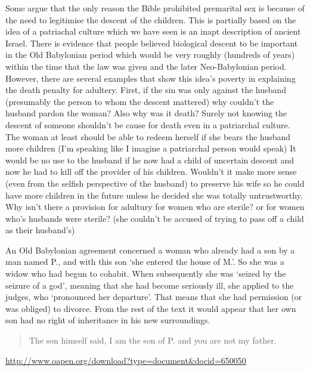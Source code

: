 \documentclass[11pt]{article}
\begin{document}
{Some argue that the only reason the Bible prohibited premarital sex is because of the need to legitimise the descent of the children. This is partially based on the idea of a patriachal culture which we have seen is an inapt description of ancient Israel. There is evidence that people believed biological descent to be important in the Old Babylonian period\cite{son of p} which would be very roughly (hundreds of years) within the time that the law was given and the later Neo-Babylonian period. \cite{exorcist in emar} However, there are several examples that show this idea's poverty in explaining the death penalty for adultery. First, if the sin was only against the husband (presumably the person to whom the descent mattered) why couldn't the husband pardon the woman? Also why was it death? Surely not knowing the descent of someone shouldn't be cause for death even in a patriarchal culture. The woman at least should be able to redeem herself if she bears the husband more children (I'm speaking like I imagine a patriarchal person would speak) It would be no use to the husband if he now had a child of uncertain descent and now he had to kill off the provider of his children. Wouldn't it make more sense (even from the selfish perspective of the husband) to preserve his wife so he could have more children in the future unless he decided she was totally untrustworthy. Why isn't there a provision for adultury for women who are sterile? or for women who's husbands were sterile? (she couldn't be accused of trying to pass off a child as their husband's) 





\medskip
\begin{thebibliography}{56}
An Old Babylonian agreement concerned a woman who already had a son by a man named P., and with this son `she entered the house of M.'. So she was a widow who had begun to cohabit. When subsequently she was `seized by the seizure of a god', meaning that she had become seriously ill, she applied to the judges, who `pronounced her departure'. That means that she had permission (or
was obliged) to divorce. From the rest of the text it would appear that her own son had no right of inheritance in his new surroundings. 

\begin{quote}
The son himself said, I am the son of P. and you are not my father.
\end{quote}
\url{http://www.oapen.org/download?type=document&docid=650050}



\end{thebibliography}}
\end{document}
